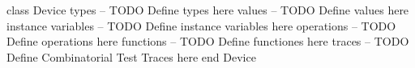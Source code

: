 \begin{vdmpp}[breaklines=true]
class Device
types
-- TODO Define types here
values
-- TODO Define values here
instance variables
-- TODO Define instance variables here
operations
-- TODO Define operations here
functions
-- TODO Define functiones here
traces
-- TODO Define Combinatorial Test Traces here
end Device
\end{vdmpp}
